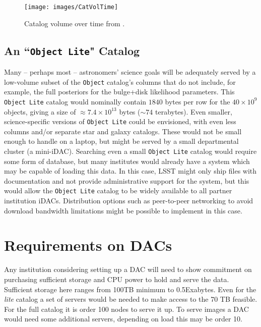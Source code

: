 \begin{figure}
\begin{center}
\texttt{[image: images/CatVolTime]}
\caption{Catalog volume over time from . \label{fig:catvol}}
\end{center}
\end{figure}

\subsection{An ``{\tt Object Lite}" Catalog}

Many -- perhaps most -- astronomers' science goals will be adequately served by a low-volume subset of the {\tt Object} catalog's columns that do not include, for example, the full posteriors for the bulge+disk likelihood parameters. This {\tt Object Lite} catalog would nominally contain $1840$ bytes per row for the $40 \times 10^{9}$ objects, giving a size of $\approx 7.4 \times 10^{13}$ bytes ($\sim74$ terabytes). Even smaller, science-specific versions of {\tt Object Lite} could be envisioned, with even less columns and/or separate star and galaxy catalogs. These would not be small enough to handle on a laptop, but might be served by a small departmental cluster (a mini-iDAC). Searching even a small {\tt Object Lite} catalog would require some form of database, but many institutes would already have a system which may be capable of loading this data. In this case, LSST might only ship files with documentation and not provide administrative support for the system, but this would allow the {\tt Object Lite} catalog to be widely available to all partner institution iDACs. Distribution options such as peer-to-peer networking to avoid download bandwidth limitations might be possible to implement in this case. 






\section{Requirements on DACs}
Any institution considering setting up a DAC will need to show commitment on purchasing sufficient storage and CPU power to hold and serve the data.
Sufficient storage here ranges from 100TB minimum to 0.5Exabytes.  Even for the \emph{lite} catalog a set of servers would be needed to make access to the 70 TB feasible. For the full catalog it is order 100 nodes to serve it up.   To serve images a DAC would need some additional servers, depending on load this may be order 10.

